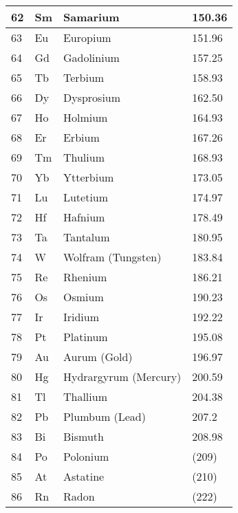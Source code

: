 \documentclass{article}
\begin{document}
\begin{center}
\begin{longtable}{|l|l|l|l|}
 \hline
    62 & Sm & \cellcolor{lanthorange}Samarium & 150.36\\
 \hline
    63 & Eu & \cellcolor{lanthorange}Europium & 151.96\\
 \hline
    64 & Gd & \cellcolor{lanthorange}Gadolinium & 157.25\\
 \hline
    65 & Tb & \cellcolor{lanthorange}Terbium & 158.93\\
 \hline
    66 & Dy & \cellcolor{lanthorange}Dysprosium & 162.50\\
 \hline
    67 & Ho & \cellcolor{lanthorange}Holmium & 164.93\\
 \hline
    68 & Er & \cellcolor{lanthorange}Erbium & 167.26\\
 \hline
    69 & Tm & \cellcolor{lanthorange}Thulium & 168.93\\
 \hline
    70 & Yb & \cellcolor{lanthorange}Ytterbium & 173.05\\
 \hline
    71 & Lu & \cellcolor{lanthorange}Lutetium & 174.97\\
 \hline
    72 & Hf & \cellcolor{transred}Hafnium & 178.49\\
 \hline
    73 & Ta & \cellcolor{transred}Tantalum & 180.95\\
 \hline
    74 & W & \cellcolor{transred}Wolfram (Tungsten) & 183.84\\
 \hline
    75 & Re & \cellcolor{transred}Rhenium & 186.21\\
 \hline
    76 & Os & \cellcolor{transred}Osmium & 190.23\\
 \hline
    77 & Ir & \cellcolor{transred}Iridium & 192.22\\
 \hline
    78 & Pt & \cellcolor{transred}Platinum & 195.08\\
 \hline
    79 & Au & \cellcolor{transred}Aurum (Gold) & 196.97\\
 \hline
    80 & Hg & \cellcolor{transred}Hydrargyrum (Mercury) & 200.59\\
 \hline
    81 & Tl & \cellcolor{postblue}Thallium & 204.38\\
 \hline
    82 & Pb & \cellcolor{postblue}Plumbum (Lead) & 207.2\\
 \hline
    83 & Bi & \cellcolor{postblue}Bismuth & 208.98\\
 \hline
    84 & Po & \cellcolor{postblue}Polonium & (209)\\
 \hline
    85 & At & \cellcolor{metalloid}Astatine & (210)\\
 \hline
    86 & Rn & \cellcolor{noblepink}Radon & (222)\\

\end{longtable}
\end{center}
\end{document}
